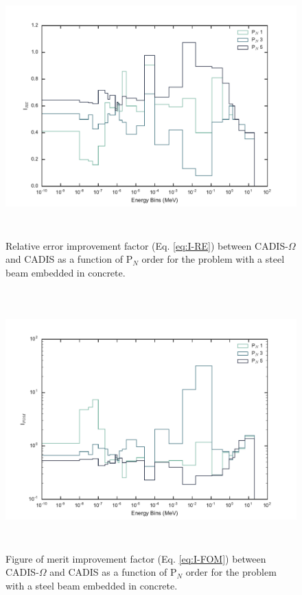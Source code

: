 \begin{figure}[h!]
  \centering
  \includegraphics[height=10cm]{./chapters/characterization_probs/figures/angle/prob_1/compare_err_pN.pdf}
  \caption[Relative error improvement factor (Eq. \eqref{eq:I-RE}) between CADIS-$\Omega$ and
  CADIS as a function of P$_N$ order for steel beam embedded in concrete.]
  {Relative error improvement factor (Eq. \eqref{eq:I-RE}) between CADIS-$\Omega$ and
   CADIS as a function of P$_N$ order for the problem with a
   steel beam embedded in concrete.}
  \label{fig:prob_1_pN_I_RE}
\end{figure}

\begin{figure}[h!]
  \centering
  \includegraphics[height=10cm]{./chapters/characterization_probs/figures/angle/prob_1/compare_fom_pN.pdf}
  \caption[Figure of merit improvement factor (Eq. \eqref{eq:I-FOM}) between CADIS-$\Omega$ and
  CADIS as a function of P$_N$ order for steel beam embedded in concrete.]
  {Figure of merit improvement factor (Eq. \eqref{eq:I-FOM}) between CADIS-$\Omega$ and
   CADIS as a function of P$_N$ order for the problem with a
   steel beam embedded in concrete.}
  \label{fig:prob_1_pN_I_FOM}
\end{figure}

